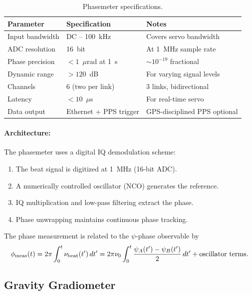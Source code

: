 \documentclass[12pt,letterpaper]{article}
\begin{document}
\begin{table}[h]
\centering
\caption{Phasemeter specifications.}
\label{tab:phasemeter}
\begin{tabular}{@{}lll@{}}
\toprule
Parameter & Specification & Notes \\
\midrule
Input bandwidth & DC -- 100~kHz & Covers servo bandwidth \\
ADC resolution & 16~bit & At 1~MHz sample rate \\
Phase precision & $< 1$~$\mu$rad at 1~s & $\sim 10^{-19}$ fractional \\
Dynamic range & $> 120$~dB & For varying signal levels \\
Channels & 6 (two per link) & 3 links, bidirectional \\
Latency & $< 10$~$\mu$s & For real-time servo \\
Data output & Ethernet + PPS trigger & GPS-disciplined PPS optional \\
\bottomrule
\end{tabular}
\end{table}

\paragraph{Architecture:}
The phasemeter uses a digital IQ demodulation scheme:
\begin{enumerate}
\item The beat signal is digitized at 1~MHz (16-bit ADC).
\item A numerically controlled oscillator (NCO) generates the reference.
\item IQ multiplication and low-pass filtering extract the phase.
\item Phase unwrapping maintains continuous phase tracking.
\end{enumerate}

The phase measurement is related to the $\psi$-phase observable by
\begin{equation}
\phi_{\rm meas}(t) = 2\pi\int_0^t \nu_{\rm beat}(t')\,dt'
= 2\pi\nu_0\int_0^t \frac{\psi_A(t') - \psi_B(t')}{2}\,dt'
+ \text{oscillator terms}.
\end{equation}

\subsection{Gravity Gradiometer}
\end{document}
